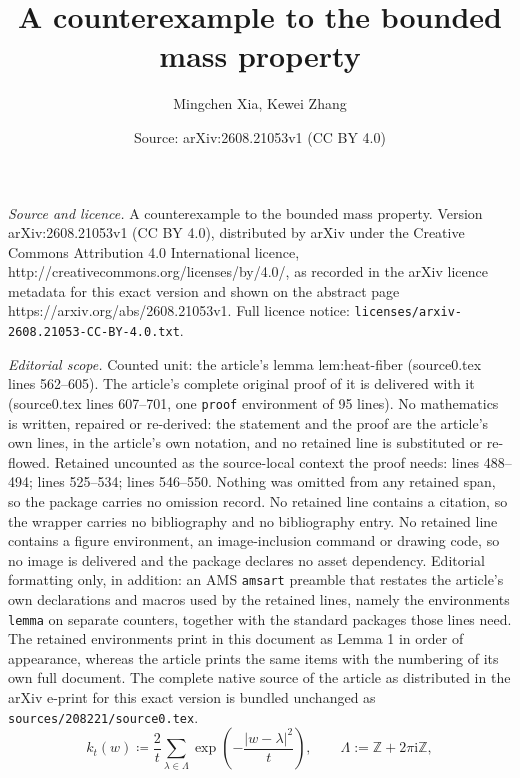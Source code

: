 \documentclass[10pt,a4paper]{amsart}
\title{A counterexample to the bounded mass property}
\author{Mingchen Xia, Kewei Zhang}
\date{Source: arXiv:2608.21053v1 (CC BY 4.0)}
\begin{document}
\maketitle

\noindent\emph{Source and licence.} A counterexample to the bounded mass property. Version arXiv:2608.21053v1 (CC BY 4.0), distributed by arXiv under the Creative Commons Attribution 4.0 International licence, http://creativecommons.org/licenses/by/4.0/, as recorded in the arXiv licence metadata for this exact version and shown on the abstract page https://arxiv.org/abs/2608.21053v1. Full licence notice: \texttt{licenses/arxiv-2608.21053-CC-BY-4.0.txt}.\par\smallskip

\noindent\textit{Editorial scope.} Counted unit: the article's lemma lem:heat-fiber (source0.tex lines 562--605). The article's complete original proof of it is delivered with it (source0.tex lines 607--701, one \texttt{proof} environment of 95 lines). No mathematics is written, repaired or re-derived: the statement and the proof are the article's own lines, in the article's own notation, and no retained line is substituted or re-flowed.  Retained uncounted as the source-local context the proof needs: lines 488--494; lines 525--534; lines 546--550.  Nothing was omitted from any retained span, so the package carries no omission record.  No retained line contains a citation, so the wrapper carries no bibliography and no bibliography entry.  No retained line contains a figure environment, an image-inclusion command or drawing code, so no image is delivered and the package declares no asset dependency.  Editorial formatting only, in addition: an AMS \texttt{amsart} preamble that restates the article's own declarations and macros used by the retained lines, namely the environments \texttt{lemma} on separate counters, together with the standard packages those lines need.  The retained environments print in this document as Lemma 1 in order of appearance, whereas the article prints the same items with the numbering of its own full document.  The complete native source of the article as distributed in the arXiv e-print for this exact version is bundled unchanged as \texttt{sources/208221/source0.tex}.
	\begin{equation}
		k_t(w)\coloneqq \frac{2}{t}\sum_{\lambda\in\Lambda}
		\exp\left(-\frac{|w-\lambda|^2}{t}\right),
		\qquad
		\Lambda:=\mathbb Z+2\pi\mathrm{i}\mathbb Z,
		\label{eq:heat-kernel}
	\end{equation}
\end{document}
